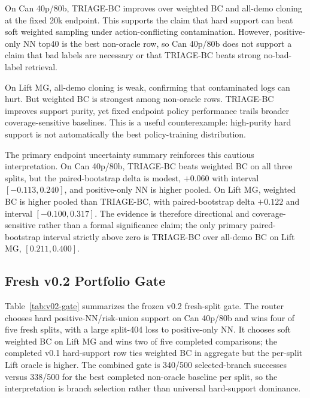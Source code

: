 \documentclass[11pt]{article}
\newcommand{\method}{TRIAGE-BC}
\begin{document}
On Can 40p/80b, \method{} improves over weighted BC and all-demo cloning at the fixed 20k endpoint. This supports the claim that hard support can beat soft weighted sampling under action-conflicting contamination. However, positive-only NN top40 is the best non-oracle row, so Can 40p/80b does not support a claim that bad labels are necessary or that \method{} beats strong no-bad-label retrieval.

On Lift MG, all-demo cloning is weak, confirming that contaminated logs can hurt. But weighted BC is strongest among non-oracle rows. \method{} improves support purity, yet fixed endpoint policy performance trails broader coverage-sensitive baselines. This is a useful counterexample: high-purity hard support is not automatically the best policy-training distribution.

The primary endpoint uncertainty summary reinforces this cautious interpretation. On Can 40p/80b, \method{} beats weighted BC on all three splits, but the paired-bootstrap delta is modest, $+0.060$ with interval $[-0.113,0.240]$, and positive-only NN is higher pooled. On Lift MG, weighted BC is higher pooled than \method{}, with paired-bootstrap delta $+0.122$ and interval $[-0.100,0.317]$. The evidence is therefore directional and coverage-sensitive rather than a formal significance claim; the only primary paired-bootstrap interval strictly above zero is \method{} over all-demo BC on Lift MG, $[0.211,0.400]$.

\subsection{Fresh v0.2 Portfolio Gate}

Table~\ref{tab:v02-gate} summarizes the frozen v0.2 fresh-split gate. The router chooses hard positive-NN/risk-union support on Can 40p/80b and wins four of five fresh splits, with a large split-404 loss to positive-only NN. It chooses soft weighted BC on Lift MG and wins two of five completed comparisons; the completed v0.1 hard-support row ties weighted BC in aggregate but the per-split Lift oracle is higher. The combined gate is 340/500 selected-branch successes versus 338/500 for the best completed non-oracle baseline per split, so the interpretation is branch selection rather than universal hard-support dominance.

\begin{table}[t]
  \centering
  \caption{Frozen v0.2 fresh endpoint gate. Counts are successes over 50 endpoint rollouts per split at epoch 200.}
  \label{tab:v02-gate}
\end{table}
\end{document}
